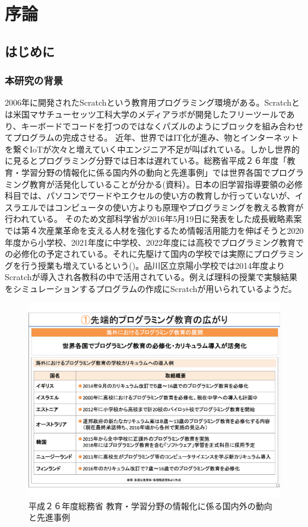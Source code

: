 \documentclass[a4paper,10pt,onecolumn,oneside,openany]{jsbook}
\begin{document}
\tableofcontents

\mainmatter

\part{序論} 
\chapter{はじめに}
\section{本研究の背景}
2006年に開発されたScratchという教育用プログラミング環境がある。Scratchとは米国マサチューセッツ工科大学のメディアラボが開発したフリーツールであり、キーボードでコードを打つのではなくパズルのようにブロックを組み合わせてプログラムの完成させる。
近年、世界ではIT化が進み、物とインターネットを繋ぐIoTが次々と増えていく中エンジニア不足が叫ばれている。しかし世界的に見るとプログラミング分野では日本は遅れている。総務省平成２６年度「教育・学習分野の情報化に係る国内外の動向と先進事例」では世界各国でプログラミング教育が活発化していることが分かる(資料\cite{itedu}）。日本の旧学習指導要領の必修科目では、パソコンでワードやエクセルの使い方の教育しか行っていないが、イスラエルではコンピュータの使い方よりも原理やプログラミングを教える教育が行われている。
そのため文部科学省が2016年5月19日に発表をした成長戦略素案では第４次産業革命を支える人材を強化するため情報活用能力を伸ばそうと2020年度から小学校、2021年度に中学校、2022年度には高校でプログラミング教育での必修化の予定されている。それに先駆けて国内の学校では実際にプログラミングを行う授業も増えているという(\cite{edu_prog})。品川区立京陽小学校では2014年度よりScratchが導入され各教科の中で活用されている。例えば理科の授業で実験結果をシミュレーションするプログラムの作成にScratchが用いられているようだ。
\begin{figure}[h]
  \centering
    \includegraphics[scale=0.4]{graphic/foreign_data.pdf}
  \caption{平成２６年度総務省 教育・学習分野の情報化に係る国内外の動向と先進事例}
  \label{itedu}
 \end{figure}
 
\end{document}
